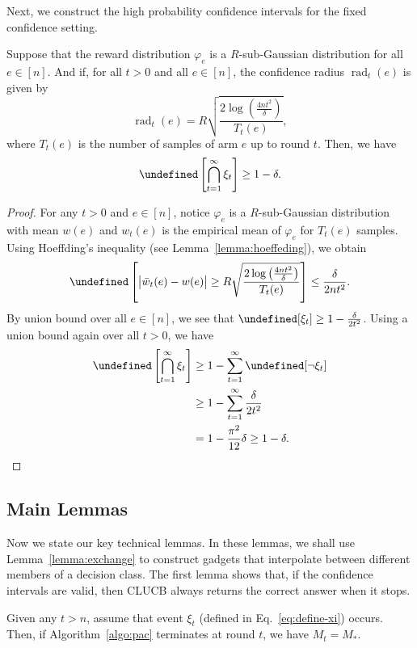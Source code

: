 \documentclass{article}
\newcommand{\Algorithm}{{\small \textsf{CLUCB}}\xspace}
\newcommand{\Rew}{\varphi}
\DeclareMathOperator{\rad}{rad}
\let\Pr\undefined
\DeclareMathOperator{\Pr}{Pr}
\begin{document}
Next, we construct the high probability confidence intervals for the fixed confidence setting.
\begin{lemma}
\label{lemma:ci}
Suppose that the reward distribution $\Rew_e$ is a $R$-sub-Gaussian distribution for all $e\in [n]$.
And if, for all $t>0$ and all $e\in [n]$, 
the confidence radius $\rad_t(e)$ is given by
$$
\rad_t(e) = R\sqrt{\frac{2\log\left(\frac{4n t^2}\delta\right)}{T_t(e)}},
$$
where $T_t(e)$ is the number of samples of arm $e$ up to round $t$.
Then, we have
$$
\Pr\left[\bigcap_{t=1}^\infty \xi_t \right] \ge 1-\delta.
$$
\end{lemma}

\begin{proof}
For any $t>0$ and $e\in [n]$, notice $\Rew_e$ is a $R$-sub-Gaussian distribution with mean $w(e)$ and $w_t(e)$ is the empirical mean of $\Rew_e$ for $T_t(e)$ samples. 
Using Hoeffding's inequality (see Lemma~\ref{lemma:hoeffeding}), we obtain
$$
\Pr\left[ \big|\bar w_t(e)-w(e) \big| \ge R\sqrt{\frac{2\log\left(\frac{4n t^2}\delta\right)}{T_t(e)}} \right] \le \frac{\delta}{2nt^2}.
$$
By union bound over all $e\in [n]$, we see that $\Pr[\xi_t] \ge 1-\frac{\delta}{2t^2}$. 
Using a union bound again over all $t>0$, we have
\begin{align*}
\Pr\left[\bigcap_{t=1}^\infty \xi_t \right] &\ge 1-\sum_{t=1}^\infty \Pr[\neg \xi_t]\\
&\ge 1-\sum_{t=1}^\infty \frac{\delta}{2t^2}\\
&= 1-\frac{\pi^2}{12}\delta \ge 1-\delta.
\end{align*}
\end{proof}



\subsection{Main Lemmas}

Now we state our key technical lemmas.
In these lemmas, we shall use Lemma~\ref{lemma:exchange} to construct gadgets that interpolate between different members of a decision class.
The first lemma shows that, if the confidence intervals are valid, then \Algorithm always returns the correct answer when it stops.
\begin{lemma}
\label{lemma:correct}
Given any $t > n$, assume that event $\xi_t$ (defined in Eq.~\eqref{eq:define-xi}) occurs.
Then, if Algorithm~\ref{algo:pac} terminates at round $t$, we have $M_t=M_*$.
\end{lemma}
\end{document}
